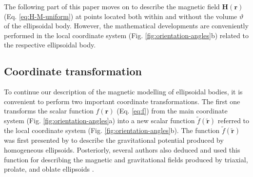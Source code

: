 \documentclass[gmd, manuscript]{copernicus}
\begin{document}
The following part of this paper moves on to describe
the magnetic field $\mathbf{H}(\mathbf{r})$
(Eq. \ref{eq:H-M-uniform}) at points located
both within and without the volume $\vartheta$ of the ellipsoidal
body. However, the mathematical developments are conveniently
performed in the local coordinate system (Fig. \ref{fig:orientation-angles}b)
related to the respective ellipsoidal body.

\subsection{Coordinate transformation}

To continue our description of the magnetic modelling of
ellipsoidal bodies, it is convenient to perform two
important coordinate transformations.
The first one transforms the scalar function
$f(\mathbf{r})$ (Eq. \ref{eq:f}) from the
main coordinate system (Fig. \ref{fig:orientation-angles}a)
into a new scalar function
$\tilde{f}(\tilde{\mathbf{r}})$ referred to the
local coordinate system (Fig. \ref{fig:orientation-angles}b).
The function $\tilde{f}(\tilde{\mathbf{r}})$ was first
presented by \citet{dirichlet1839} to describe the gravitational potential
produced by homogeneous ellipsoids.
Posteriorly, several authors also deduced and used this function
for describing the magnetic and gravitational fields produced
by triaxial, prolate, and oblate ellipsoids
\citep{maxwell1873, thomson1879, dubois1896,
peirce1902, webster1904, kellogg1929, stoner1945, osborn1945,
peake1953, macmillan1958, chang1961, lowes1974,  clark1986,
tejedor1995, sttraton2007}.
\end{document}
